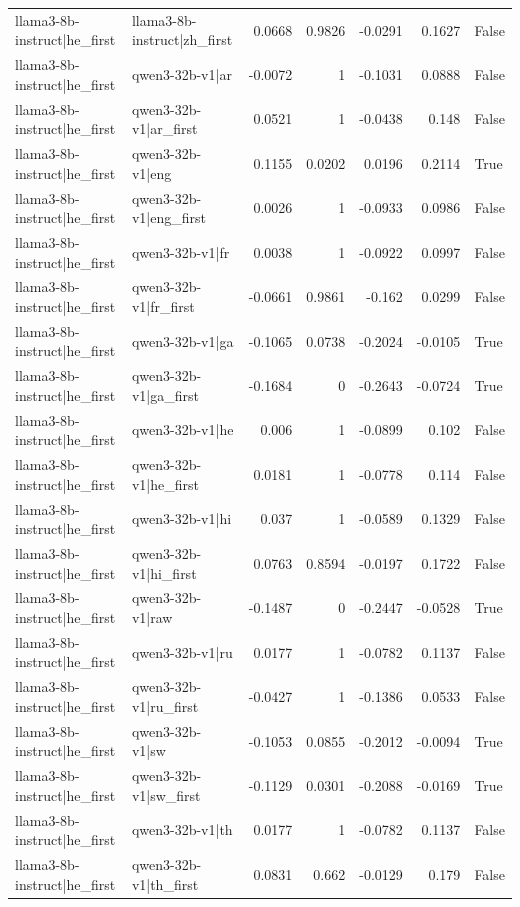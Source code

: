 \begin{table}
\begin{tabular}{l l r r r r l}
llama3-8b-instruct|he_first & llama3-8b-instruct|zh_first & 0.0668 & 0.9826 & -0.0291 & 0.1627 & False \\
llama3-8b-instruct|he_first & qwen3-32b-v1|ar & -0.0072 & 1 & -0.1031 & 0.0888 & False \\
llama3-8b-instruct|he_first & qwen3-32b-v1|ar_first & 0.0521 & 1 & -0.0438 & 0.148 & False \\
llama3-8b-instruct|he_first & qwen3-32b-v1|eng & 0.1155 & 0.0202 & 0.0196 & 0.2114 & True \\
llama3-8b-instruct|he_first & qwen3-32b-v1|eng_first & 0.0026 & 1 & -0.0933 & 0.0986 & False \\
llama3-8b-instruct|he_first & qwen3-32b-v1|fr & 0.0038 & 1 & -0.0922 & 0.0997 & False \\
llama3-8b-instruct|he_first & qwen3-32b-v1|fr_first & -0.0661 & 0.9861 & -0.162 & 0.0299 & False \\
llama3-8b-instruct|he_first & qwen3-32b-v1|ga & -0.1065 & 0.0738 & -0.2024 & -0.0105 & True \\
llama3-8b-instruct|he_first & qwen3-32b-v1|ga_first & -0.1684 & 0 & -0.2643 & -0.0724 & True \\
llama3-8b-instruct|he_first & qwen3-32b-v1|he & 0.006 & 1 & -0.0899 & 0.102 & False \\
llama3-8b-instruct|he_first & qwen3-32b-v1|he_first & 0.0181 & 1 & -0.0778 & 0.114 & False \\
llama3-8b-instruct|he_first & qwen3-32b-v1|hi & 0.037 & 1 & -0.0589 & 0.1329 & False \\
llama3-8b-instruct|he_first & qwen3-32b-v1|hi_first & 0.0763 & 0.8594 & -0.0197 & 0.1722 & False \\
llama3-8b-instruct|he_first & qwen3-32b-v1|raw & -0.1487 & 0 & -0.2447 & -0.0528 & True \\
llama3-8b-instruct|he_first & qwen3-32b-v1|ru & 0.0177 & 1 & -0.0782 & 0.1137 & False \\
llama3-8b-instruct|he_first & qwen3-32b-v1|ru_first & -0.0427 & 1 & -0.1386 & 0.0533 & False \\
llama3-8b-instruct|he_first & qwen3-32b-v1|sw & -0.1053 & 0.0855 & -0.2012 & -0.0094 & True \\
llama3-8b-instruct|he_first & qwen3-32b-v1|sw_first & -0.1129 & 0.0301 & -0.2088 & -0.0169 & True \\
llama3-8b-instruct|he_first & qwen3-32b-v1|th & 0.0177 & 1 & -0.0782 & 0.1137 & False \\
llama3-8b-instruct|he_first & qwen3-32b-v1|th_first & 0.0831 & 0.662 & -0.0129 & 0.179 & False \\

\end{tabular}
\end{table}

